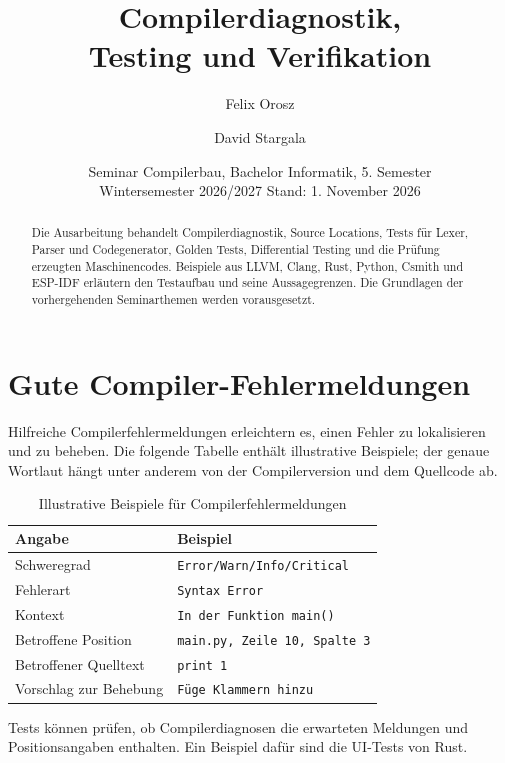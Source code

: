 \documentclass[11pt,a4paper]{article}
\title{\vspace*{-10mm}Compilerdiagnostik,\\Testing und Verifikation\\}
\author{Felix Orosz \and David Stargala}
\date{Seminar Compilerbau, Bachelor Informatik, 5. Semester\\
  Wintersemester 2026/2027 \quad Stand: 1. November 2026}
\renewcommand{\arraystretch}{1.18}
\begin{document}
\renewcommand{\labelenumi}{\arabic{enumi})}
\maketitle
\thispagestyle{firstpage}
\begin{abstract}
Die Ausarbeitung behandelt Compilerdiagnostik, Source Locations, Tests für
Lexer, Parser und Codegenerator, Golden Tests, Differential Testing und
die Prüfung erzeugten Maschinencodes. Beispiele aus LLVM, Clang, Rust,
Python, Csmith und ESP-IDF erläutern den Testaufbau und seine Aussagegrenzen.
Die Grundlagen der vorhergehenden Seminarthemen werden vorausgesetzt.
\end{abstract}
\setcounter{tocdepth}{1}
\tableofcontents
\newpage

\section{Gute Compiler-Fehlermeldungen}

Hilfreiche Compilerfehlermeldungen erleichtern es, einen Fehler zu lokalisieren
und zu beheben. Die folgende Tabelle enthält illustrative Beispiele; der genaue
Wortlaut hängt unter anderem von der Compilerversion und dem Quellcode ab.

\begin{table}[htbp]
  \centering
  \caption{Illustrative Beispiele für Compilerfehlermeldungen}
  \label{tab:compiler-fehlermeldungen}
  \small
  \renewcommand{\arraystretch}{1.2}
  \begin{tabularx}{\linewidth}{@{}l>{\raggedright\arraybackslash}X@{}}
    \toprule
    \textbf{Angabe} & \textbf{Beispiel} \\
    \midrule
    Schweregrad & \texttt{Error/Warn/Info/Critical}  \\
    Fehlerart & \texttt{Syntax Error} \\
    Kontext & \texttt{In der Funktion main()} \\
    Betroffene Position & \texttt{main.py, Zeile 10, Spalte 3} \\
    Betroffener Quelltext & \texttt{print 1} \\
    Vorschlag zur Behebung & \texttt{Füge Klammern hinzu} \\
    \bottomrule
  \end{tabularx}
\end{table}

Tests können prüfen, ob Compilerdiagnosen die erwarteten Meldungen und Positionsangaben enthalten. Ein Beispiel dafür sind die UI-Tests von Rust.
\end{document}
